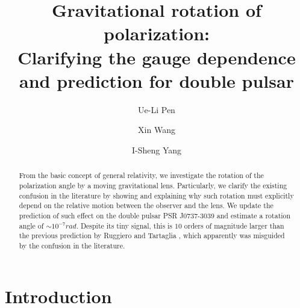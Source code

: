 \documentclass[aps,showpacs,twocolumn,floats,prd,superscriptaddress,nofootinbib]{revtex4}
\begin{document}
\title{Gravitational rotation of polarization: \\ 
Clarifying the gauge dependence and prediction for double pulsar}

\author{Ue-Li Pen}

\author{Xin Wang}

\author{I-Sheng Yang}

\begin{abstract}
From the basic concept of general relativity, we investigate the rotation of the polarization angle by a moving 
gravitational lens. 
Particularly, we clarify the existing confusion in the literature by showing and explaining why such rotation must explicitly depend on the relative motion between the observer and the lens. 
We update the prediction of such effect on the double pulsar PSR J0737-3039 and estimate a rotation angle 
of $\sim 10^{-7}rad$. 
Despite its tiny signal, this is $10$ orders of magnitude larger than the previous prediction by Ruggiero and Tartaglia \cite{RugTar06}, which apparently was misguided by the confusion in the literature. 
\end{abstract}

\maketitle

\section{Introduction}
\end{document}
